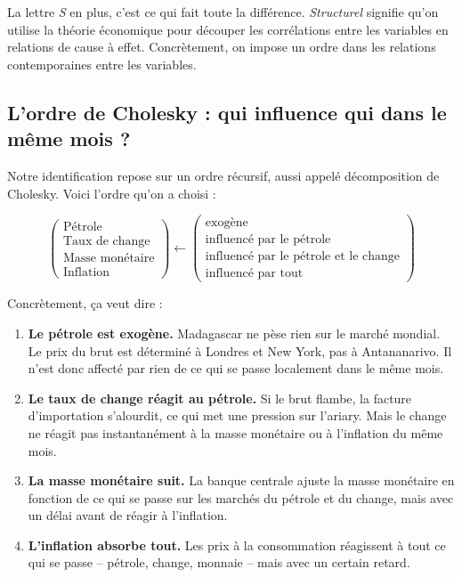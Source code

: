 \documentclass[12pt,a4paper]{article}
\begin{document}
La lettre \emph{S} en plus, c'est ce qui fait toute la différence. \emph{Structurel} signifie qu'on utilise la théorie économique pour découper les corrélations entre les variables en relations de cause à effet. Concrètement, on impose un ordre dans les relations contemporaines entre les variables.

\subsection{L'ordre de Cholesky : qui influence qui dans le même mois ?}

Notre identification repose sur un ordre récursif, aussi appelé décomposition de Cholesky. Voici l'ordre qu'on a choisi :

\begin{equation}
  \begin{pmatrix}
    \text{Pétrole} \\
    \text{Taux de change} \\
    \text{Masse monétaire} \\
    \text{Inflation}
  \end{pmatrix}
  \leftarrow
  \begin{pmatrix}
    \text{exogène} \\
    \text{influencé par le pétrole} \\
    \text{influencé par le pétrole et le change} \\
    \text{influencé par tout}
  \end{pmatrix}
\end{equation}

\noindent Concrètement, ça veut dire :

\begin{enumerate}
  \item \textbf{Le pétrole est exogène.} Madagascar ne pèse rien sur le marché mondial. Le prix du brut est déterminé à Londres et New York, pas à Antananarivo. Il n'est donc affecté par rien de ce qui se passe localement dans le même mois.
  \item \textbf{Le taux de change réagit au pétrole.} Si le brut flambe, la facture d'importation s'alourdit, ce qui met une pression sur l'ariary. Mais le change ne réagit pas instantanément à la masse monétaire ou à l'inflation du même mois.
  \item \textbf{La masse monétaire suit.} La banque centrale ajuste la masse monétaire en fonction de ce qui se passe sur les marchés du pétrole et du change, mais avec un délai avant de réagir à l'inflation.
  \item \textbf{L'inflation absorbe tout.} Les prix à la consommation réagissent à tout ce qui se passe -- pétrole, change, monnaie -- mais avec un certain retard.
\end{enumerate}
\end{document}
